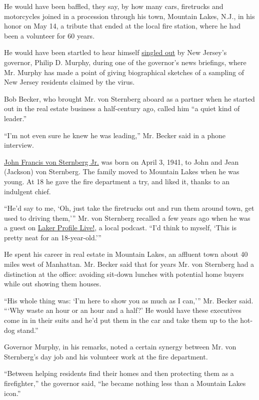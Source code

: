 He would have been baffled, they say, by how many cars, firetrucks and
motorcycles joined in a procession through his town, Mountain Lakes,
N.J., in his honor on May 14, a tribute that ended at the local fire
station, where he had been a volunteer for 60 years.

He would have been startled to hear himself
\href{https://www.facebookcorewwwi.onion/100001157507057/posts/2894874863894402/}{singled
out} by New Jersey's governor, Philip D. Murphy, during one of the
governor's news briefings, where Mr. Murphy has made a point of giving
biographical sketches of a sampling of New Jersey residents claimed by
the virus.

Bob Becker, who brought Mr. von Sternberg aboard as a partner when he
started out in the real estate business a half-century ago, called him
``a quiet kind of leader.''

``I'm not even sure he knew he was leading,'' Mr. Becker said in a phone
interview.

\href{https://obits.nj.com/obituaries/starledger/obituary.aspx?n=john-f-von-sternberg\&pid=196183514\&fhid=6054}{John
Francis von Sternberg Jr.} was born on April 3, 1941, to John and Jean
(Jackson) von Sternberg. The family moved to Mountain Lakes when he was
young. At 18 he gave the fire department a try, and liked it, thanks to
an indulgent chief.

``He'd say to me, `Oh, just take the firetrucks out and run them around
town, get used to driving them,''' Mr. von Sternberg recalled a few
years ago when he was a guest on
\href{https://mtnlakes.org/laker-profiles/john-von-sternberg/}{Laker
Profile Live!}, a local podcast. ``I'd think to myself, `This is pretty
neat for an 18-year-old.'''

He spent his career in real estate in Mountain Lakes, an affluent town
about 40 miles west of Manhattan. Mr. Becker said that for years Mr. von
Sternberg had a distinction at the office: avoiding sit-down lunches
with potential home buyers while out showing them houses.

``His whole thing was: `I'm here to show you as much as I can,''' Mr.
Becker said. ```Why waste an hour or an hour and a half?' He would have
these executives come in in their suits and he'd put them in the car and
take them up to the hot-dog stand.''

Governor Murphy, in his remarks, noted a certain synergy between Mr. von
Sternberg's day job and his volunteer work at the fire department.

``Between helping residents find their homes and then protecting them as
a firefighter,'' the governor said, ``he became nothing less than a
Mountain Lakes icon.''

